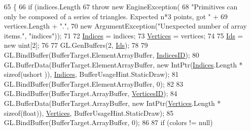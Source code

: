 \begin{DoxyCode}
65         \{
66             \textcolor{keywordflow}{if} (indices.Length %
67                 \textcolor{keywordflow}{throw} \textcolor{keyword}{new} EngineException(
68                     \textcolor{stringliteral}{"Primitives can only be composed of a series of triangles. Expected n*3 points, got "} +
69                     vertices.Length + \textcolor{stringliteral}{"."},
70                     \textcolor{keyword}{new} ArgumentException(\textcolor{stringliteral}{"Unexpected number of array items."}, \textcolor{stringliteral}{"indices"}));
71 
72             \hyperlink{class_tri_devs_1_1_tri_engine2_d_1_1_graphics_1_1_primitive_a61d1e5ea5ec5236f27a0282a96df7396}{Indices} = indices;
73             \hyperlink{class_tri_devs_1_1_tri_engine2_d_1_1_graphics_1_1_primitive_a04b2caa85d31b4dd377f171845d49d15}{Vertices} = vertices;
74 
75             \hyperlink{class_tri_devs_1_1_tri_engine2_d_1_1_graphics_1_1_primitive_a64b2622a8f8e5c6726fd0e246f55154f}{Ids} = \textcolor{keyword}{new} uint[2];
76 
77             GL.GenBuffers(2, \hyperlink{class_tri_devs_1_1_tri_engine2_d_1_1_graphics_1_1_primitive_a64b2622a8f8e5c6726fd0e246f55154f}{Ids});
78 
79             GL.BindBuffer(BufferTarget.ElementArrayBuffer, \hyperlink{class_tri_devs_1_1_tri_engine2_d_1_1_graphics_1_1_primitive_a0856124fa599dbb34e44169c331094a2}{IndicesID});
80             GL.BufferData(BufferTarget.ElementArrayBuffer, \textcolor{keyword}{new} IntPtr(\hyperlink{class_tri_devs_1_1_tri_engine2_d_1_1_graphics_1_1_primitive_a61d1e5ea5ec5236f27a0282a96df7396}{Indices}.Length * \textcolor{keyword}{sizeof}(ushort
      )), \hyperlink{class_tri_devs_1_1_tri_engine2_d_1_1_graphics_1_1_primitive_a61d1e5ea5ec5236f27a0282a96df7396}{Indices}, BufferUsageHint.StaticDraw);
81             GL.BindBuffer(BufferTarget.ElementArrayBuffer, 0);
82 
83             GL.BindBuffer(BufferTarget.ArrayBuffer, \hyperlink{class_tri_devs_1_1_tri_engine2_d_1_1_graphics_1_1_primitive_acda37c3b5c83823f7299da2296a43cbd}{VerticesID});
84             GL.BufferData(BufferTarget.ArrayBuffer, \textcolor{keyword}{new} IntPtr(\hyperlink{class_tri_devs_1_1_tri_engine2_d_1_1_graphics_1_1_primitive_a04b2caa85d31b4dd377f171845d49d15}{Vertices}.Length * \textcolor{keyword}{sizeof}(\textcolor{keywordtype}{float})), 
      \hyperlink{class_tri_devs_1_1_tri_engine2_d_1_1_graphics_1_1_primitive_a04b2caa85d31b4dd377f171845d49d15}{Vertices}, BufferUsageHint.StaticDraw);
85             GL.BindBuffer(BufferTarget.ArrayBuffer, 0);
86 
87             \textcolor{keywordflow}{if} (colors != null)

\end{DoxyCode}
